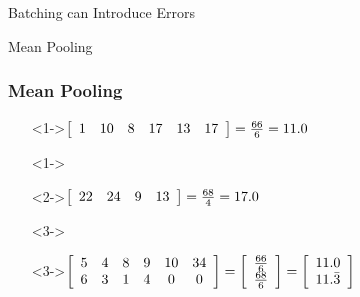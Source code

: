 \documentclass{beamer}
\begin{document}
\begin{section}{Batching can Introduce Errors}

    \begin{subsection}{Mean Pooling}
        \begin{frame}
            \frametitle{Mean Pooling}
            \begin{itemize}
            \item[]<1->$
                \left[ \begin{array}{*6{c}}
                    1 & 10 & 8 & 17 & 13 & 17
                \end{array} \right] = \frac{66}{6} = 11.0
            $
            \item[]<1->
            \item[]<2->$
                \left[ \begin{array}{*4{c}}
                    22 & 24 & 9 & 13
                \end{array} \right] = \frac{68}{4} = 17.0
            $
            \item[]<3->
            \item[]<3->$
                \left[ \begin{array}{*6{c}}
                    5 & 4 & 8 & 9 & 10 & 34 \\
                    6 & 3 & 1 & 4 & 0 & 0
                \end{array} \right] =
                \left[ \begin{array}{c}
                    \frac{66}{6} \\
                    \frac{68}{6}
                \end{array} \right] =
                \left[ \begin{array}{c}
                    11.0 \\
                    11.\bar{3}
                \end{array} \right]
            $
            \end{itemize}
\end{frame}
\end{subsection}
\end{section}
\end{document}
